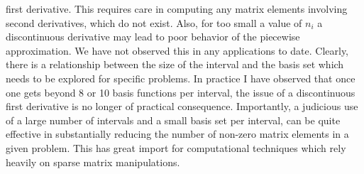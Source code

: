 \documentclass[preprint,aps]{revtex4}
\begin{document}
first derivative.  This requires care in computing any matrix elements involving
second derivatives, which do not exist.  Also, for too small a value of $n_{i}$ 
a discontinuous derivative may lead to poor behavior of the piecewise approximation.
We have not observed this in any applications to date.
Clearly, there is a relationship between the size of the interval and the basis set 
which needs to be explored for specific problems.  In practice I have observed 
that once one gets beyond 8 or 10 basis functions per interval, the issue of a 
discontinuous first derivative is no longer of practical consequence.  Importantly, 
a judicious use of a large number of intervals and a small basis set per interval, 
can be quite effective in substantially reducing the number of non-zero matrix 
elements in a given problem.  This has great import for computational techniques 
which rely heavily on sparse matrix manipulations.
\end{document}
